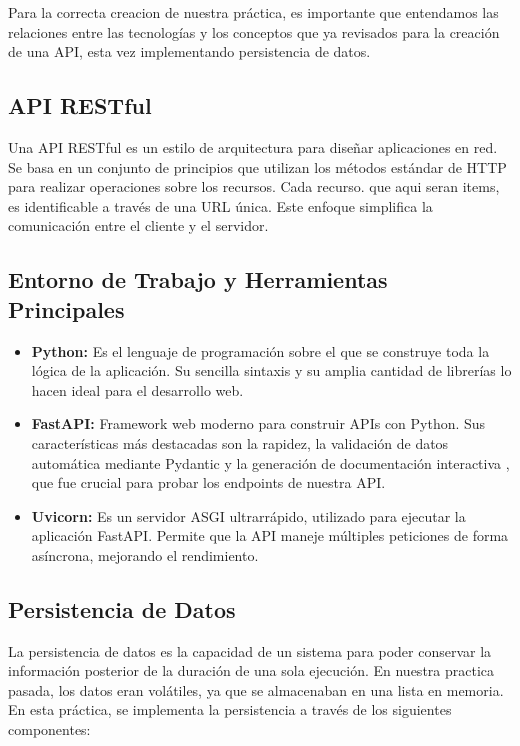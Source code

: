 \documentclass[12pt]{article}
\begin{document}
Para la correcta creacion de nuestra práctica, es importante que entendamos las relaciones entre las tecnologías y los conceptos que ya revisados para la creación de una API, esta vez implementando persistencia de datos.

\subsection*{API RESTful}
Una API RESTful es un estilo de arquitectura para diseñar aplicaciones en red. Se basa en un conjunto de principios que utilizan los métodos estándar de HTTP para realizar operaciones sobre los recursos. Cada recurso. que aqui seran items, es identificable a través de una URL única. Este enfoque simplifica la comunicación entre el cliente y el servidor.\cite{ref1}

\subsection*{Entorno de Trabajo y Herramientas Principales}
\begin{itemize}
    \item \textbf{Python:} Es el lenguaje de programación sobre el que se construye toda la lógica de la aplicación. Su sencilla sintaxis y su amplia cantidad de librerías lo hacen ideal para el desarrollo web.\cite{ref2}
    \item \textbf{FastAPI:} Framework web moderno para construir APIs con Python. Sus características más destacadas son la rapidez, la validación de datos automática mediante Pydantic y la generación de documentación interactiva , que fue crucial para probar los endpoints de nuestra API.
    \item \textbf{Uvicorn:} Es un servidor ASGI ultrarrápido, utilizado para ejecutar la aplicación FastAPI. Permite que la API maneje múltiples peticiones de forma asíncrona, mejorando el rendimiento.\cite{ref3}
\end{itemize}

\subsection*{Persistencia de Datos}
La persistencia de datos es la capacidad de un sistema para poder conservar la información posterior de la duración de una sola ejecución. En nuestra practica pasada, los datos eran volátiles, ya que se almacenaban en una lista en memoria. En esta práctica, se implementa la persistencia a través de los siguientes componentes:
\end{document}
